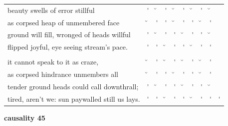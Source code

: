 \documentclass[12pt, landscape]{article}
\begin{document}
\begin{center}
\begin{tabularx}{\textwidth}{
>{\lefting\arraybackslash}X
c
c
c
c
c
c
c
c
c
}

beauty swells of error stillful & \'{} & \u{} & \'{} & \u{} & \'{} & \u{} & \'{} & \u{} & \\
as corpsed heap of unmembered face & \u{} & \'{} & \'{} & \u{} & \'{} & \'{} & \u{} & \'{} & \\
ground will fill, wronged of heads willful & \'{} & \u{} & \'{} & \'{} & \u{} & \'{} & \'{} & \u{} & \\
flipped joyful, eye seeing stream's pace. & \'{} & \'{} & \u{} & \'{} & \'{} & \u{} & \'{} & \'{} & \\
 & & & & & & & & \\
it cannot speak to it as craze, & \u{} & \'{} & \u{} & \'{} & \u{} & \'{} & \u{} & \'{} & \\
as corpsed hindrance unmembers all & \u{} & \'{} & \'{} & \u{} & \'{} & \'{} & \u{} & \'{} & \\
tender ground heads could call downthrall; & \'{} & \u{} & \'{} & \'{} & \u{} & \'{} & \'{} & \u{} & \\
tired, aren't we: sun paywalled still us lays.  & \'{} & \'{} & \u{} & \'{} & \'{} & \u{} & \'{} & \'{} & \'{} \\

\end{tabularx}
\end{center}

\vspace*{\fill}

\newpage

\vspace*{\fill}

\noindent \textbf{causality 45}
\noindent \hfill \par
\end{document}
